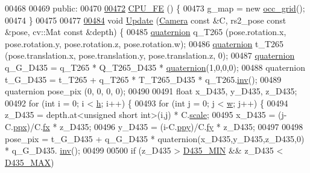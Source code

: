 \begin{DoxyCode}
00468 
00469 \textcolor{keyword}{public}:
00470 
\hypertarget{Voxel_8hpp_source.tex_l00472}{}\hyperlink{classCPU__FE_a17780bbe106fb8f752e06987b5eefc7f}{00472}     \hyperlink{classCPU__FE_a17780bbe106fb8f752e06987b5eefc7f}{CPU\_FE} () \{
00473         g\_map = \textcolor{keyword}{new} \hyperlink{classocc__grid}{occ\_grid}();
00474     \}
00475 
00477 
\hypertarget{Voxel_8hpp_source.tex_l00484}{}\hyperlink{classCPU__FE_aae7cb60a405b294a680a929ecff5c2ae}{00484}     \textcolor{keywordtype}{void} \hyperlink{classCPU__FE_aae7cb60a405b294a680a929ecff5c2ae}{Update} (\hyperlink{classCamera}{Camera} \textcolor{keyword}{const} &C, rs2\_pose \textcolor{keyword}{const} &pose, cv::Mat \textcolor{keyword}{const} &depth) \{
00485         \hyperlink{classquaternion}{quaternion} q\_T265 (pose.rotation.x, pose.rotation.y, pose.rotation.z, pose.rotation.w);
00486         \hyperlink{classquaternion}{quaternion} t\_T265 (pose.translation.x, pose.translation.y, pose.translation.z, 0);
00487         \hyperlink{classquaternion}{quaternion} q\_G\_D435 = q\_T265 * Q\_T265\_D435 * \hyperlink{classquaternion_a01adb7930c2003b777cb91a7182c482e}{quaternion}(1,0,0,0);
00488         quaternion t\_G\_D435 = t\_T265 + q\_T265 * T\_T265\_D435 * q\_T265.\hyperlink{classquaternion_a5f2dff4e0f446d05e826a63d5a45d230}{inv}();
00489         quaternion pose\_pix (0, 0, 0, 0);
00490 
00491         \textcolor{keywordtype}{float} x\_D435, y\_D435, z\_D435;
00492         \textcolor{keywordflow}{for} (\textcolor{keywordtype}{int} i = 0; i < \hyperlink{Camera_8hpp_a3f40fea9b1040e381f08ddd4b026765d}{h}; i++) \{
00493             \textcolor{keywordflow}{for} (\textcolor{keywordtype}{int} j = 0; j < \hyperlink{classquaternion_ab2b38aca1971114e0ba4218b75d7f472}{w}; j++) \{
00494                 z\_D435 = depth.at<\textcolor{keywordtype}{unsigned} \textcolor{keywordtype}{short} \textcolor{keywordtype}{int}>(i,j) * C.\hyperlink{classCamera_a50152f7c8f2ce7601dd6086c90b3a65c}{scale};
00495                 x\_D435 = (j-C.\hyperlink{classCamera_aa646a2de04e9ad37395dcf3c4a171abe}{ppx})/C.\hyperlink{classCamera_a4f5e789525c1c9306028c080922582e2}{fx} * z\_D435;
00496                 y\_D435 = (i-C.\hyperlink{classCamera_a0e51f157264b9c9e18feb584c5a6c606}{ppy})/C.\hyperlink{classCamera_a1472650e23f3df5f23dda7f94537e889}{fy} * z\_D435;
00497 
00498                 pose\_pix = t\_G\_D435 + q\_G\_D435 * quaternion(x\_D435,y\_D435,z\_D435,0) * q\_G\_D435.
      \hyperlink{classquaternion_a5f2dff4e0f446d05e826a63d5a45d230}{inv}();
00499 
00500                 \textcolor{keywordflow}{if} (z\_D435 > \hyperlink{Camera_8hpp_a8c14b0a57a757fa1eca7b19c2d0bd110}{D435\_MIN} && z\_D435 < \hyperlink{Camera_8hpp_a525f4d6ba7971b5fc8f0bc55ea826762}{D435\_MAX})

\end{DoxyCode}
